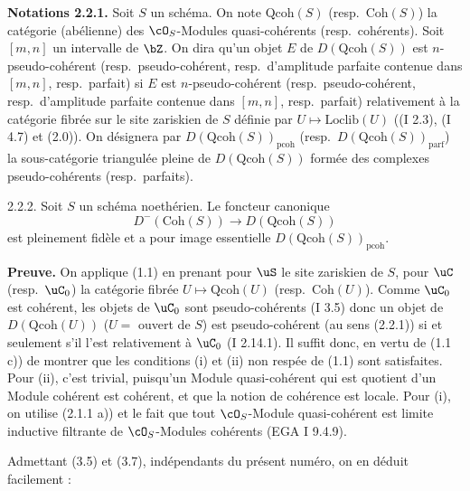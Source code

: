 \noindent\textbf{Notations 2.2.1.} Soit $S$ un sch\'{e}ma. On note $\mathrm{Qcoh}(S)$ (resp.~$\mathrm{Coh}(S)$) la cat\'{e}gorie (ab\'{e}lienne) des $\cO_S$-Modules quasi-coh\'{e}rents (resp.~coh\'{e}rents). Soit $[m,n]$ un intervalle de $\bZ$. On dira qu'un objet $E$ de $D(\mathrm{Qcoh}(S))$ est $n$-pseudo-coh\'{e}rent (resp.~pseudo-coh\'{e}rent, resp.~d'amplitude parfaite contenue dans $[m,n]$, resp.~parfait) si $E$ est $n$-pseudo-coh\'{e}rent (resp.~pseudo-coh\'{e}rent, resp.~d'amplitude parfaite contenue dans $[m,n]$, resp.~parfait) relativement \`{a} la cat\'{e}gorie fibr\'{e}e sur le site zariskien de $S$ d\'{e}finie par $U \longmapsto \mathrm{Loclib}(U)$ ((I 2.3), (I 4.7) et (2.0)). On d\'{e}signera par $D(\mathrm{Qcoh}(S))_{\mathrm{pcoh}}$ (resp.~$D(\mathrm{Qcoh}(S))_{\mathrm{parf}}$) la sous-cat\'{e}gorie triangul\'{e}e pleine de $D(\mathrm{Qcoh}(S))$ form\'{e}e des complexes pseudo-coh\'{e}rents (resp.~parfaits).

\begin{proposition} 2.2.2\footnotemark.
Soit $S$ un sch\'{e}ma noeth\'{e}rien. Le foncteur canonique
\[
D^-(\mathrm{Coh}(S)) \longrightarrow D(\mathrm{Qcoh}(S))
\]
est pleinement fid\`{e}le et a pour image essentielle $D(\mathrm{Qcoh}(S))_{\mathrm{pcoh}}$.
\end{proposition}

\noindent\textbf{Preuve.} On applique (1.1) en prenant pour $\uS$ le site zariskien de $S$, pour $\uC$ (resp.~$\uC_0$) la cat\'{e}gorie fibr\'{e}e $U \mapsto \mathrm{Qcoh}(U)$ (resp.~$\mathrm{Coh}(U)$). Comme $\uC_0$ est coh\'{e}rent, les objets de $\uC_0$ sont pseudo-coh\'{e}rents (I 3.5) donc un objet de $D(\mathrm{Qcoh}(U))$ ($U = $ ouvert de $S$) est pseudo-coh\'{e}rent (au sens (2.2.1)) si et seulement s'il l'est relativement \`{a} $\uC_0$ (I 2.14.1). Il suffit donc, en vertu de (1.1 c)) de montrer que les conditions (i) et (ii) non resp\'{e}e de (1.1) sont satisfaites. Pour (ii), c'est trivial, puisqu'un Module quasi-coh\'{e}rent qui est quotient d'un Module coh\'{e}rent est coh\'{e}rent, et que la notion de coh\'{e}rence est locale. Pour (i), on utilise (2.1.1 a)) et le fait que tout $\cO_S$-Module quasi-coh\'{e}rent est limite inductive filtrante de $\cO_S$-Modules coh\'{e}rents (EGA I 9.4.9).

Admettant (3.5) et (3.7), ind\'{e}pendants du pr\'{e}sent num\'{e}ro, on en d\'{e}duit facilement :

